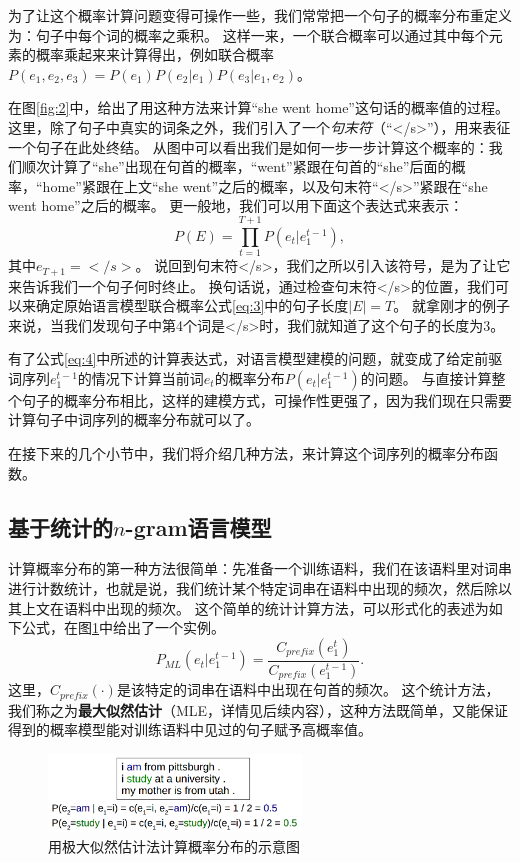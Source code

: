 \documentclass[10pt,a4paper]{ctexart}
\begin{document}
为了让这个概率计算问题变得可操作一些，我们常常把一个句子的概率分布重定义为：句子中每个词的概率之乘积。
这样一来，一个联合概率可以通过其中每个元素的概率乘起来来计算得出，例如联合概率$P(e_1,e_2,e_3)=P(e_1)P(e_2|e_1)P(e_3|e_1,e_2)$。

在图\ref{fig:2}中，给出了用这种方法来计算“she went home”这句话的概率值的过程。
这里，除了句子中真实的词条之外，我们引入了一个\textit{句末符}（“</s>”），用来表征一个句子在此处终结。
从图中可以看出我们是如何一步一步计算这个概率的：我们顺次计算了“she”出现在句首的概率，“went”紧跟在句首的“she”后面的概率，“home”紧跟在上文“she went”之后的概率，以及句末符“</s>”紧跟在“she went home”之后的概率。
更一般地，我们可以用下面这个表达式来表示：
\begin{equation}\label{eq:4}
 P(E) = \prod_{t=1}^{T+1} P(e_t|e_1^{t-1}),
\end{equation}
其中$e_{T+1}=</s>$。
说回到句末符</s>，我们之所以引入该符号，是为了让它来告诉我们一个句子何时终止。
换句话说，通过检查句末符</s>的位置，我们可以来确定原始语言模型联合概率公式\ref{eq:3}中的句子长度$|E|=T$。
就拿刚才的例子来说，当我们发现句子中第4个词是</s>时，我们就知道了这个句子的长度为3。

有了公式\ref{eq:4}中所述的计算表达式，对语言模型建模的问题，就变成了给定前驱词序列$e_1^{t-1}$的情况下计算当前词$e_t$的概率分布$P(e_t|e_1^{t-1})$的问题。
与直接计算整个句子的概率分布相比，这样的建模方式，可操作性更强了，因为我们现在只需要计算句子中词序列的概率分布就可以了。

在接下来的几个小节中，我们将介绍几种方法，来计算这个词序列的概率分布函数。


\subsection{基于统计的$n$-gram语言模型}
计算概率分布的第一种方法很简单：先准备一个训练语料，我们在该语料里对词串进行计数统计，也就是说，我们统计某个特定词串在语料中出现的频次，然后除以其上文在语料中出现的频次。
这个简单的统计计算方法，可以形式化的表述为如下公式，在图\ref{fig:3}中给出了一个实例。
\begin{equation}\label{eq:5}
  P_{ML}(e_t|e_1^{t-1})=\frac{C_{prefix}(e_1^t)}{C_{prefix}(e_1^{t-1})}.
\end{equation}
这里，$C_{prefix}(\cdot)$是该特定的词串在语料中出现在句首的频次。
这个统计方法，我们称之为\textbf{最大似然估计}（MLE，详情见后续内容），这种方法既简单，又能保证得到的概率模型能对训练语料中见过的句子赋予高概率值。

\begin{figure}[H]
\centering
\includegraphics[width=0.6\textwidth]{fig3.png}
\caption{用极大似然估计法计算概率分布的示意图}
\label{fig:3}
\end{figure}
\end{document}
